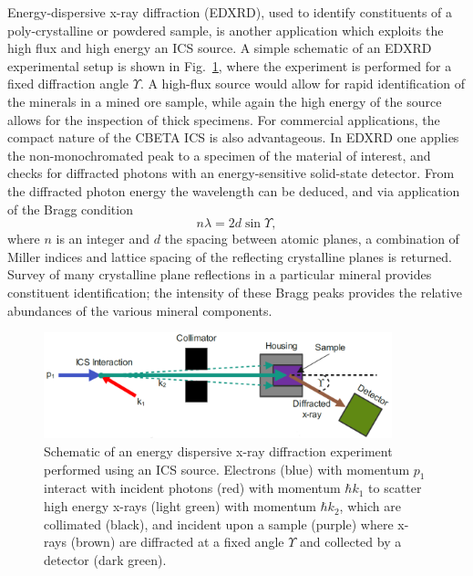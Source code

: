 \documentclass[../main.tex]{subfiles}
\begin{document}
Energy-dispersive x-ray diffraction (EDXRD), used to identify constituents of a poly-crystalline or powdered sample, is another application which exploits the high flux and high energy an ICS source. A simple schematic of an EDXRD experimental setup is shown in Fig.~\ref{fig:EDXRD_diagram}, where the experiment is performed for a fixed diffraction angle $\Upsilon$. A high-flux source would allow for rapid identification of the minerals in a mined ore sample, while again the high energy of the source allows for the inspection of thick specimens. For commercial applications, the compact nature of the CBETA ICS is also advantageous. In EDXRD \cite{kampfe2005energy} one applies the non-monochromated peak to a specimen of the material of interest, and checks for diffracted photons with an energy-sensitive solid-state detector. From the diffracted photon energy the wavelength can be deduced, and via application of the Bragg condition \cite{bragg1913reflection}
\begin{equation}
n\lambda = 2d\sin\Upsilon,
\label{eq:Bragg_condition}
\end{equation}
where $n$ is an integer and $d$ the spacing between atomic planes, a combination of Miller indices and lattice spacing of the reflecting crystalline planes is returned. Survey of many crystalline plane reflections in a particular mineral provides constituent identification; the intensity of these Bragg peaks provides the relative abundances of the various mineral components. 
\begin{figure}[!h]
\centering
\includegraphics[width=0.9\textwidth]{Figures/CBETA_Inverse_Compton_Source_Design/EDXRD_diagram_fixed.pdf}
\caption{Schematic of an energy dispersive x-ray diffraction experiment performed using an ICS source. Electrons (blue) with momentum $p_{1}$ interact with incident photons (red) with momentum $\hbar k_{1}$ to scatter high energy x-rays (light green) with momentum $\hbar k_{2}$, which are collimated (black), and incident upon a sample (purple) where x-rays (brown) are diffracted at a fixed angle $\Upsilon$ and collected by a detector (dark green).}
\label{fig:EDXRD_diagram}    
\end{figure}
\end{document}
